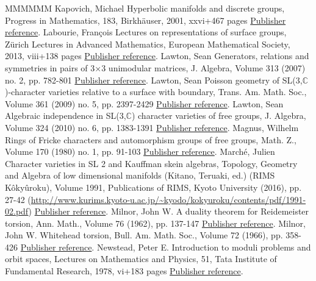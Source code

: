 \documentclass[11pt]{article}
\theoremstyle{definition}
\numberwithin{equation}{section}
\numberwithin{figure}{section}
\numberwithin{table}{section}
\begin{document}
\begin{thebibliography}{MMMMMM}
 Kapovich, Michael Hyperbolic manifolds and discrete groups, Progress in Mathematics, 183, Birkhäuser, 2001, xxvi+467 pages \href{https://ahl.centre-mersenne.org/item/AHL_2020__3__341_0/#Kapovich}{Publisher reference}.
 Labourie, François Lectures on representations of surface groups, Zürich Lectures in Advanced Mathematics, European Mathematical Society, 2013, viii+138 pages \href{https://ahl.centre-mersenne.org/item/AHL_2020__3__341_0/#LabourieSG}{Publisher reference}.
 Lawton, Sean Generators, relations and symmetries in pairs of 3×3 unimodular matrices, J. Algebra, Volume 313 (2007) no. 2, pp. 782-801 \href{https://ahl.centre-mersenne.org/item/AHL_2020__3__341_0/#LawtonJA}{Publisher reference}.
 Lawton, Sean Poisson geometry of SL(3,\(\mathbb{C}\))-character varieties relative to a surface with boundary, Trans. Am. Math. Soc., Volume 361 (2009) no. 5, pp. 2397-2429 \href{https://ahl.centre-mersenne.org/item/AHL_2020__3__341_0/#LawtonP}{Publisher reference}.
 Lawton, Sean Algebraic independence in SL(3,\(\mathbb{C}\)) character varieties of free groups, J. Algebra, Volume 324 (2010) no. 6, pp. 1383-1391 \href{https://ahl.centre-mersenne.org/item/AHL_2020__3__341_0/#LawtonAI}{Publisher reference}.
 Magnus, Wilhelm Rings of Fricke characters and automorphism groups of free groups, Math. Z., Volume 170 (1980) no. 1, pp. 91-103 \href{https://ahl.centre-mersenne.org/item/AHL_2020__3__341_0/#Magnus}{Publisher reference}.
 Marché, Julien Character varieties in SL 2  and Kauffman skein algebras, Topology, Geometry and Algebra of low dimensional manifolds (Kitano, Teruaki, ed.) (RIMS Kôkyûroku), Volume 1991, Publications of RIMS, Kyoto University (2016), pp. 27-42 (\url{http://www.kurims.kyoto-u.ac.jp/~kyodo/kokyuroku/contents/pdf/1991-02.pdf}) \href{https://ahl.centre-mersenne.org/item/AHL_2020__3__341_0/#Marche2016}{Publisher reference}.
 Milnor, John W. A duality theorem for Reidemeister torsion, Ann. Math., Volume 76 (1962), pp. 137-147 \href{https://ahl.centre-mersenne.org/item/AHL_2020__3__341_0/#MilnorDuality}{Publisher reference}.
 Milnor, John W. Whitehead torsion, Bull. Am. Math. Soc., Volume 72 (1966), pp. 358-426 \href{https://ahl.centre-mersenne.org/item/AHL_2020__3__341_0/#MilnorBullAMS}{Publisher reference}.
 Newstead, Peter E. Introduction to moduli problems and orbit spaces, Lectures on Mathematics and Physics, 51, Tata Institute of Fundamental Research, 1978, vi+183 pages \href{https://ahl.centre-mersenne.org/item/AHL_2020__3__341_0/#Newstead}{Publisher reference}.

\end{thebibliography}
\end{document}
